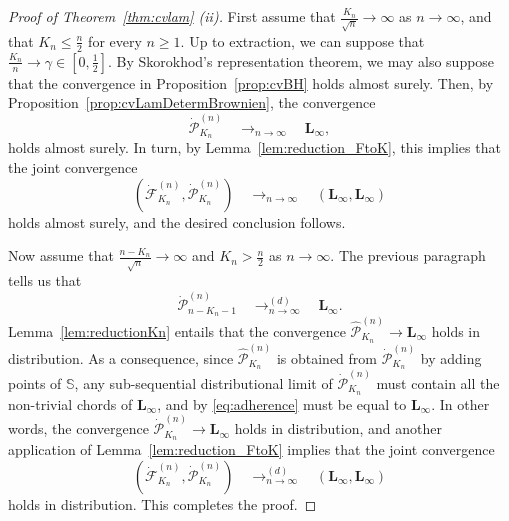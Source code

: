 \documentclass[AHL,XML,longabstracts,Unicode]{cedram}
\def\S{\mathbb{S}}
\def\dFKn{\dot{\mathcal{F}}^{(n)}_{K_{n}}}
\def\dPKn{\dot{\mathcal{P}}^{(n)}_{K_{n}}}
\begin{document}
\begin{proof}[Proof of  Theorem~\ref{thm:cvlam} (ii)]
First assume that $\frac{K_{n}}{\sqrt{n}} \rightarrow \infty$ as $n \rightarrow \infty$, and that $K_{n} \leq \frac{n}{2}$ for every $n \geq 1$. Up to extraction, we can suppose that $\tfrac{K_{n}}{n} \rightarrow \gamma \in [0,\tfrac{1}{2}]$. By Skorokhod's representation theorem, we may also suppose that the convergence in  Proposition~\ref{prop:cvBH} holds almost surely. Then, by Proposition~\ref{prop:cvLamDetermBrownien}, the convergence
\[ \dPKn    \quad \mathop{\longrightarrow}_{n \rightarrow \infty} \quad \mathbf{L}_{\infty},\]
holds almost surely. In turn, by Lemma~\ref{lem:reduction_FtoK}, this implies that the joint convergence
 \[ \left( \dFKn , \dPKn \right)   \quad \mathop{\longrightarrow}_{n \rightarrow \infty} \quad ( \mathbf{L}_{\infty},\mathbf{L}_{\infty})\]
holds almost surely, and the desired conclusion follows.

Now assume that $\frac{n-K_{n}}{\sqrt{n}} \rightarrow \infty$ and $K_{n} > \frac{n}{2}$ as $n \rightarrow \infty$.
The previous paragraph tells us that
\[   \dot{\mathcal{P}}^{(n)}_{n-K_{n}-1}  \quad \mathop{\longrightarrow}^{(d)}_{n \rightarrow \infty} \quad \mathbf{L}_{\infty}.\]
Lemma~\ref{lem:reductionKn} entails that the convergence $\hat{\mathcal{P}}^{(n)}_{K_{n}} \rightarrow  \mathbf{L}_{\infty}$ holds in distribution. As a consequence,  since $\hat{\mathcal{P}}^{(n)}_{K_{n}}$ is obtained from  $\dot{\mathcal{P}}^{(n)}_{K_{n}}$ by adding points of $\S$, any sub-sequential distributional limit of $\dot{\mathcal{P}}^{(n)}_{K_{n}}$ must contain all the non-trivial chords of $\mathbf{L}_{\infty}$, and by \eqref{eq:adherence} must be equal to $\mathbf{L}_{\infty}$. In other words, the convergence $\dot{\mathcal{P}}^{(n)}_{K_{n}} \rightarrow  \mathbf{L}_{\infty}$ holds in distribution, and  another application of Lemma~\ref{lem:reduction_FtoK} implies that  the joint convergence
 \[ \left( \dFKn,   \dPKn \right)   \quad \mathop{\longrightarrow}^{(d)}_{n \rightarrow \infty} \quad ( \mathbf{L}_{\infty},\mathbf{L}_{\infty})\]
holds in distribution. This completes the proof.
\end{proof}
\end{document}
